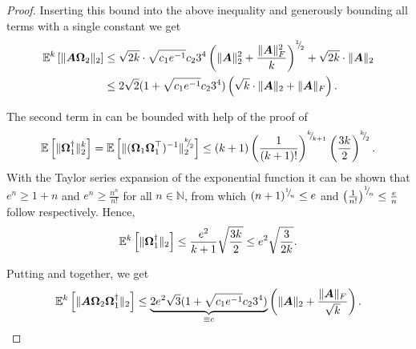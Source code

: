 \documentclass[12pt]{article}
\begin{document}
\begin{proof}
    Inserting this bound into the above inequality and generously bounding all terms with a single constant we get
    \begin{align}
        \mathbb{E}^{k}\left[ \lVert \boldsymbol{A} \boldsymbol{\Omega}_2 \rVert _2 \right]
        &\leq \sqrt{2k} \cdot \sqrt{c_1 e^{-1}} c_2 3^4 \left( \lVert \boldsymbol{A} \rVert _2^2  + \frac{\lVert \boldsymbol{A} \rVert _F^2}{k} \right)^{{}^{1}{\mskip -5mu/\mskip -3mu}_{2}} + \sqrt{2k} \cdot \lVert \boldsymbol{A} \rVert _2 \notag \\
        &\leq 2 \sqrt{2} (1 + \sqrt{c_1 e^{-1}} c_2 3^4)\left( \sqrt{k} \cdot \lVert \boldsymbol{A} \rVert _2  + \lVert \boldsymbol{A} \rVert _F \right).
        \label{equ:OSE-moment-bound-first}
    \end{align}

    The second term in  can be bounded with help of the proof of \cite[Lemma B.3]{tropp-2023-randomized-algorithms}
    \begin{equation}
        \mathbb{E}\left[ \lVert \boldsymbol{\Omega}_1^{\dagger} \rVert _2^{k} \right]
        = \mathbb{E}\left[ \lVert ( \boldsymbol{\Omega}_1 \boldsymbol{\Omega}_1^{\top} )^{-1} \rVert _2^{{}^{k}{\mskip -5mu/\mskip -3mu}_{2}} \right]
        \leq \left( k + 1 \right) \left( \frac{1}{(k + 1)!}\right)^{{}^{k}{\mskip -5mu/\mskip -3mu}_{k + 1}} \left( \frac{3 k}{2}\right)^{{}^{k}{\mskip -5mu/\mskip -3mu}_{2}}.
    \end{equation}
    With the Taylor series expansion of the exponential function it can be shown that $e^n \geq 1 + n$ and $e^n \geq \frac{n^n}{n!}$ for all $n \in \mathbb{N}$, from which $(n + 1)^{{}^{1}{\mskip -5mu/\mskip -3mu}_{n}} \leq e$ and $\left( \frac{1}{n!} \right)^{{}^{1}{\mskip -5mu/\mskip -3mu}_{n}} \leq \frac{e}{n}$ follow respectively. Hence,
    \begin{equation}
        \mathbb{E}^{k}\left[ \lVert \boldsymbol{\Omega}_1^{\dagger} \rVert _2 \right]
        \leq \frac{e^2}{k + 1}\sqrt{ \frac{3k}{2} }
        \leq e^2 \sqrt{\frac{3}{2k}}.
        \label{equ:OSE-moment-bound-second}
    \end{equation}

    Putting  and   together, we get
    \begin{equation}
        \mathbb{E}^{k}\left[ \lVert \boldsymbol{A} \boldsymbol{\Omega}_2 \boldsymbol{\Omega}_1^{\dagger} \rVert _2 \right]
        \leq \underbrace{2 e^2\sqrt{3} (1 + \sqrt{c_1 e^{-1}} c_2 3^4)}_{\equiv c}\left( \lVert \boldsymbol{A} \rVert _2  + \frac{\lVert \boldsymbol{A} \rVert _F}{\sqrt{k}} \right).
    \end{equation}

\end{proof}
\end{document}
